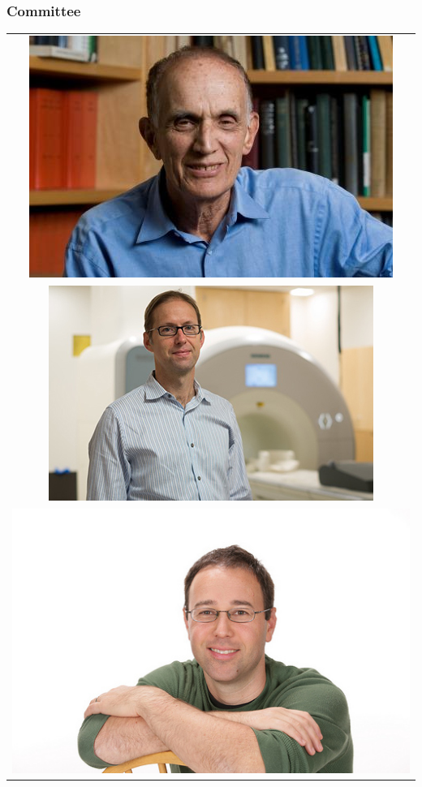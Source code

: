 \documentclass{beamer}
\begin{document}
\begin{frame}
\frametitle{Committee}
\begin{center}
\begin{tabular}{c}
\includegraphics[scale = 0.8]{2014_Efron-indoors.jpg}\\
\includegraphics[scale = 0.19]{poldrack_photo2_400.jpg}\\
\includegraphics[scale = 0.19]{tsachypic.jpg}
\end{tabular}
\end{center}
\end{frame}
\end{document}
